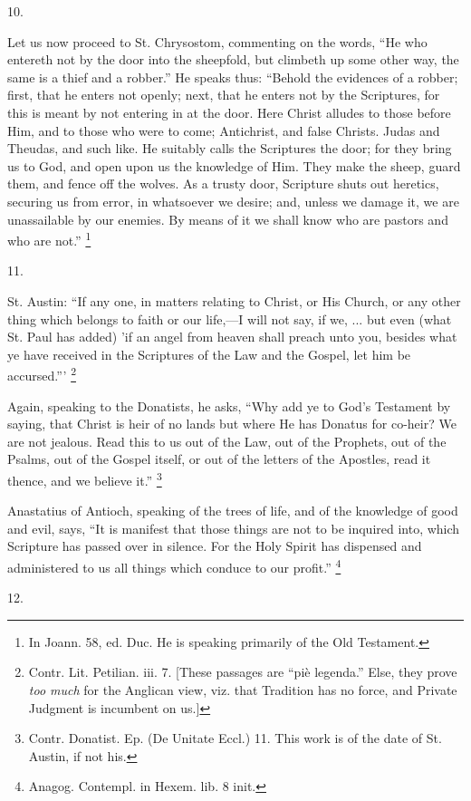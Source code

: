 10.

Let us now proceed to St. Chrysostom, commenting on the words,
``He who entereth not by the door into the sheepfold, but climbeth
up some other way, the same is a thief and a robber.'' He speaks
thus: ``Behold the evidences of a robber; first, that he enters
not openly; next, that he enters not by the Scriptures, for this is
meant by not entering in at the door. Here Christ alludes to those
before Him, and to those who were to come; Antichrist, and false
Christs. Judas and Theudas, and such like. He suitably calls the
Scriptures the door; for they bring us to God, and open upon us the
knowledge of Him. They make the sheep, guard them, and fence off the
wolves. As a trusty door, Scripture shuts out heretics, securing us
from error, in whatsoever we desire; and, unless we damage it, we are
unassailable by our enemies. By means of it we shall know who are
pastors and who are not.'' \footnote{In Joann. 58, ed. Duc. He is speaking primarily of the Old
Testament.}

11.

St. Austin: ``If any one, in matters relating to Christ, or His
Church, or any other thing which belongs to faith or our life,—I
will not say, if we, ... but even (what St. Paul has added) 'if an
angel from heaven shall preach unto you, besides what ye have received
in the Scriptures of the Law and the Gospel, let him be
accursed.''' \footnote{Contr. Lit. Petilian. iii. 7. [These passages are ``piè
legenda.'' Else, they prove \emph{too much} for the Anglican view, viz.
that Tradition has no force, and Private Judgment is incumbent on us.]}

Again, speaking to the Donatists, he asks, ``Why add ye
to God's Testament by saying, that Christ is heir of no lands but
where He has Donatus for co-heir? We are not jealous. Read this to us
out of the Law, out of the Prophets, out of the Psalms, out of the
Gospel itself, or out of the letters of the Apostles, read it thence,
and we believe it.'' \footnote{Contr. Donatist. Ep. (De Unitate Eccl.) 11. This work is of the
date of St. Austin, if not his.}

Anastatius of Antioch, speaking of the trees of life, and of the
knowledge of good and evil, says, ``It is manifest that those
things are not to be inquired into, which Scripture has passed over in
silence. For the Holy Spirit has dispensed and administered to us all
things which conduce to our profit.'' \footnote{Anagog. Contempl. in Hexem. lib. 8 init.}

12.


